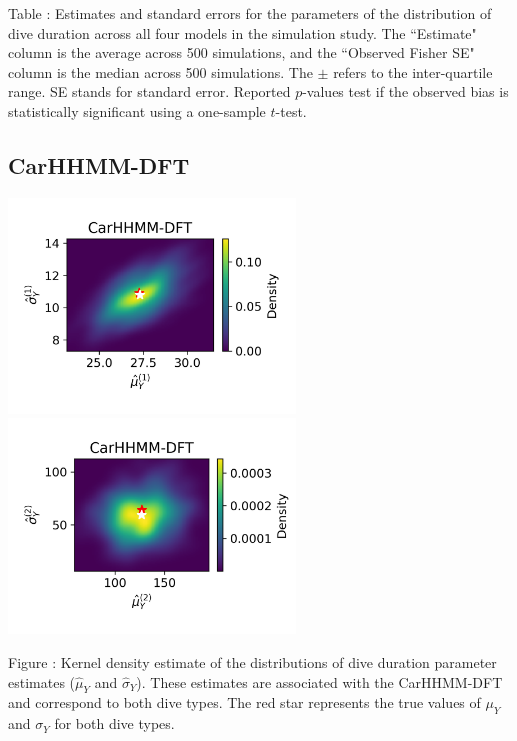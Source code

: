 \documentclass{article}
\begin{document}
        \noindent Table : Estimates and standard errors for the parameters of the distribution of dive duration across all four models in the simulation study. The ``Estimate" column is the average across 500 simulations, and the ``Observed Fisher SE" column is the median across 500 simulations. The $\pm$ refers to the inter-quartile range. SE stands for standard error. Reported $p$-values test if the observed bias is statistically significant using a one-sample $t$-test.
        \addtocounter{tablenum}{1}
        
        \newpage
        
        \subsection{CarHHMM-DFT}
        \begin{center}
        \includegraphics[width=3in]{../Plots/hhmm_FV_MLE_density_dive_duration_-1_0.png}
        \includegraphics[width=3in]{../Plots/hhmm_FV_MLE_density_dive_duration_-1_1.png}
        \end{center}
        
        \noindent Figure : Kernel density estimate of the distributions of dive duration parameter estimates ($\hat \mu_Y$ and $\hat \sigma_Y$). These estimates are associated with the CarHHMM-DFT and correspond to both dive types. The red star represents the true values of $\mu_Y$ and $\sigma_Y$ for both dive types.
        \addtocounter{fignum}{1}
        
\end{document}
